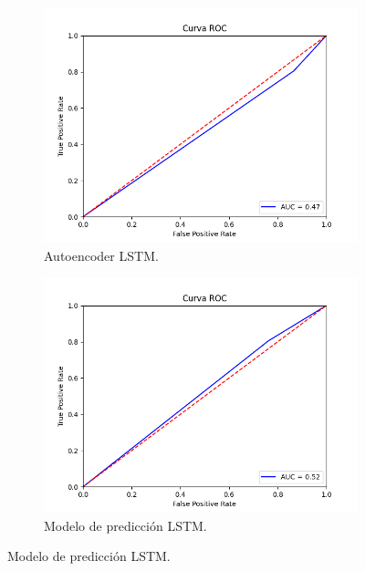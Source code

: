 \begin{figure}[H]
	\centering
	\begin{subfigure}{.49\textwidth}
		\centering
		\includegraphics[scale=0.42]{imagenes/roc/Autoencoder-LSTM_roc.png}
		\caption{Autoencoder LSTM.}
	\end{subfigure}
	\begin{subfigure}{.49\textwidth}
		\centering
		\includegraphics[scale=0.42]{imagenes/roc/Predictor-LSTM_roc.png}
		\caption{Modelo de predicción LSTM.}
	\end{subfigure}
	\label{img:roc2}
\end{figure}

